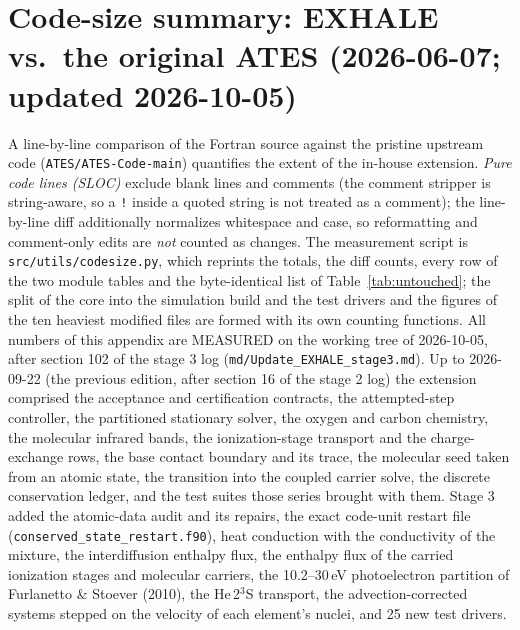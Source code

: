 \section{Code-size summary: EXHALE vs.\ the original ATES (2026-06-07; updated 2026-10-05)}
A line-by-line comparison of the Fortran source against the pristine upstream code
(\texttt{ATES/ATES-Code-main}) quantifies the extent of the in-house extension.
\emph{Pure code lines (SLOC)} exclude blank lines and comments (the comment
stripper is string-aware, so a \texttt{!} inside a quoted string is not treated as
a comment); the line-by-line diff additionally normalizes whitespace and case, so
reformatting and comment-only edits are \emph{not} counted as changes. The
measurement script is \texttt{src/utils/codesize.py}, which reprints the
totals, the diff counts, every row of the two module tables and the
byte-identical list of Table~\ref{tab:untouched}; the split of the core into
the simulation build and the test drivers and the figures of the ten heaviest
modified files are formed with its own counting functions. All numbers of this appendix are MEASURED on the
working tree of 2026-10-05, after section 102 of the stage 3 log
(\texttt{md/Update\_EXHALE\_stage3.md}). Up to 2026-09-22 (the previous
edition, after section 16 of the stage 2 log) the extension comprised
the acceptance and certification contracts, the attempted-step controller, the
partitioned stationary solver, the oxygen and carbon chemistry, the molecular
infrared bands, the ionization-stage transport and the charge-exchange rows,
the base contact boundary and its trace, the molecular seed taken from an
atomic state, the transition into the coupled carrier solve, the discrete
conservation ledger, and the test suites those series brought with them.
Stage 3 added the atomic-data audit and its repairs, the exact code-unit
restart file (\texttt{conserved\_state\_restart.f90}), heat conduction with
the conductivity of the mixture, the interdiffusion enthalpy flux, the
enthalpy flux of the carried ionization stages and molecular carriers, the
10.2--30\,eV photoelectron partition of Furlanetto \& Stoever (2010), the
He\,2$^3$S transport, the advection-corrected systems stepped on the velocity
of each element's nuclei, and 25 new test drivers.

